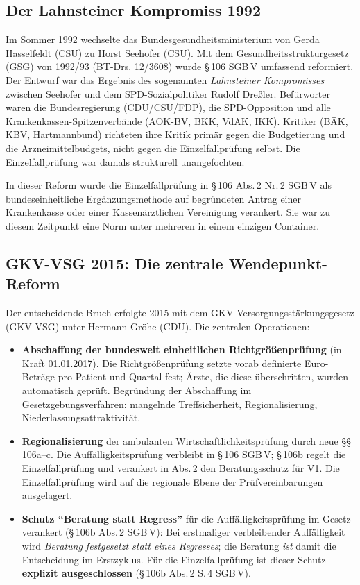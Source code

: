 \documentclass{umbruch-position}
\begin{document}
\subsection{Der Lahnsteiner Kompromiss 1992}

Im Sommer 1992 wechselte das Bundesgesundheitsministerium von Gerda Hasselfeldt (CSU) zu Horst Seehofer (CSU). Mit dem Gesundheitsstrukturgesetz (GSG) von 1992/93 (BT-Drs. 12/3608) wurde \S\,106 SGB\,V umfassend reformiert. Der Entwurf war das Ergebnis des sogenannten \textit{Lahnsteiner Kompromisses} zwischen Seehofer und dem SPD-Sozialpolitiker Rudolf Dreßler. Befürworter waren die Bundesregierung (CDU/CSU/FDP), die SPD-Opposition und alle Krankenkassen-Spitzenverbände (AOK-BV, BKK, VdAK, IKK). Kritiker (BÄK, KBV, Hartmannbund) richteten ihre Kritik primär gegen die Budgetierung und die Arzneimittelbudgets, nicht gegen die Einzelfallprüfung selbst. Die Einzelfallprüfung war damals strukturell unangefochten.

In dieser Reform wurde die Einzelfallprüfung in \S\,106 Abs.\,2 Nr.\,2 SGB\,V als bundeseinheitliche Ergänzungsmethode auf begründeten Antrag einer Krankenkasse oder einer Kassenärztlichen Vereinigung verankert. Sie war zu diesem Zeitpunkt eine Norm unter mehreren in einem einzigen Container.

\subsection{GKV-VSG 2015: Die zentrale Wendepunkt-Reform}

Der entscheidende Bruch erfolgte 2015 mit dem GKV-Versorgungsstärkungsgesetz (GKV-VSG) unter Hermann Gröhe (CDU). Die zentralen Operationen:

\begin{itemize}[nosep]
  \item \textbf{Abschaffung der bundesweit einheitlichen Richtgrößenprüfung} (in Kraft 01.01.2017). Die Richtgrößenprüfung setzte vorab definierte Euro-Beträge pro Patient und Quartal fest; Ärzte, die diese überschritten, wurden automatisch geprüft. Begründung der Abschaffung im Gesetzgebungsverfahren: mangelnde Treffsicherheit, Regionalisierung, Niederlassungs\-attraktivität.
  \item \textbf{Regionalisierung} der ambulanten Wirtschaftlichkeitsprüfung durch neue \S\S\,106a--c. Die Auffälligkeitsprüfung verbleibt in \S\,106 SGB\,V; \S\,106b regelt die Einzelfallprüfung und verankert in Abs.\,2 den Beratungsschutz für V1. Die Einzelfallprüfung wird auf die regionale Ebene der Prüfvereinbarungen ausgelagert.
  \item \textbf{Schutz ``Beratung statt Regress''} für die Auffälligkeitsprüfung im Gesetz verankert (\S\,106b Abs.\,2 SGB\,V): Bei erstmaliger verbleibender Auffälligkeit wird \textit{Beratung festgesetzt statt eines Regresses}; die Beratung \emph{ist} damit die Entscheidung im Erstzyklus. Für die Einzelfallprüfung ist dieser Schutz \textbf{explizit ausgeschlossen} (\S\,106b Abs.\,2 S.\,4 SGB\,V).
\end{itemize}
\end{document}
